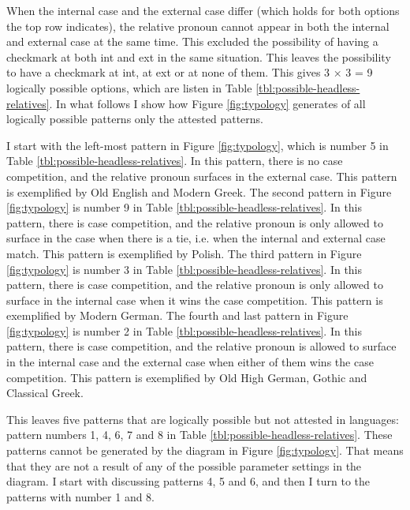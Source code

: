 When the internal case and the external case differ (which holds for both options the top row indicates), the relative pronoun cannot appear in both the internal and external case at the same time. This excluded the possibility of having a checkmark at both \ac{int} and \ac{ext} in the same situation. This leaves the possibility to have a checkmark at \ac{int}, at \ac{ext} or at none of them. This gives 3 × 3 = 9 logically possible options, which are listen in Table \ref{tbl:possible-headless-relatives}.
In what follows I show how Figure \ref{fig:typology} generates of all logically possible patterns only the attested patterns.

I start with the left-most pattern in Figure \ref{fig:typology}, which is number 5 in Table \ref{tbl:possible-headless-relatives}. In this pattern, there is no case competition, and the relative pronoun surfaces in the external case. This pattern is exemplified by Old English and Modern Greek.
The second pattern in Figure \ref{fig:typology} is number 9 in Table \ref{tbl:possible-headless-relatives}. In this pattern, there is case competition, and the relative pronoun is only allowed to surface in the case when there is a tie, i.e. when the internal and external case match. This pattern is exemplified by Polish.
The third pattern in Figure \ref{fig:typology} is number 3 in Table \ref{tbl:possible-headless-relatives}. In this pattern, there is case competition, and the relative pronoun is only allowed to surface in the internal case when it wins the case competition. This pattern is exemplified by Modern German.
The fourth and last pattern in Figure \ref{fig:typology} is number 2 in Table \ref{tbl:possible-headless-relatives}. In this pattern, there is case competition, and the relative pronoun is allowed to surface in the internal case and the external case when either of them wins the case competition. This pattern is exemplified by Old High German, Gothic and Classical Greek.

This leaves five patterns that are logically possible but not attested in languages: pattern numbers 1, 4, 6, 7 and 8 in Table \ref{tbl:possible-headless-relatives}. These patterns cannot be generated by the diagram in Figure \ref{fig:typology}. That means that they are not a result of any of the possible parameter settings in the diagram. I start with discussing patterns 4, 5 and 6, and then I turn to the patterns with number 1 and 8.

